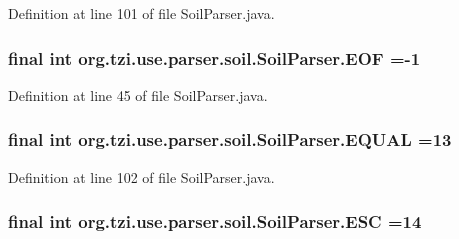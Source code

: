Definition at line 101 of file Soil\-Parser.\-java.

\hypertarget{classorg_1_1tzi_1_1use_1_1parser_1_1soil_1_1_soil_parser_aa3e8fb753d23bb565005ac82b188b1dd}{
\subsubsection[{E\-O\-F}]{\setlength{\rightskip}{0pt plus 5cm}final int org.\-tzi.\-use.\-parser.\-soil.\-Soil\-Parser.\-E\-O\-F =-\/1\hspace{0.3cm}{\ttfamily [static]}}}\label{classorg_1_1tzi_1_1use_1_1parser_1_1soil_1_1_soil_parser_aa3e8fb753d23bb565005ac82b188b1dd}


Definition at line 45 of file Soil\-Parser.\-java.

\hypertarget{classorg_1_1tzi_1_1use_1_1parser_1_1soil_1_1_soil_parser_ac070811cf3cd08099f17e7a3bf125b55}{
\subsubsection[{E\-Q\-U\-A\-L}]{\setlength{\rightskip}{0pt plus 5cm}final int org.\-tzi.\-use.\-parser.\-soil.\-Soil\-Parser.\-E\-Q\-U\-A\-L =13\hspace{0.3cm}{\ttfamily [static]}}}\label{classorg_1_1tzi_1_1use_1_1parser_1_1soil_1_1_soil_parser_ac070811cf3cd08099f17e7a3bf125b55}


Definition at line 102 of file Soil\-Parser.\-java.

\hypertarget{classorg_1_1tzi_1_1use_1_1parser_1_1soil_1_1_soil_parser_a71c699ea05651735750e58d9ce148dcb}{
\subsubsection[{E\-S\-C}]{\setlength{\rightskip}{0pt plus 5cm}final int org.\-tzi.\-use.\-parser.\-soil.\-Soil\-Parser.\-E\-S\-C =14\hspace{0.3cm}{\ttfamily [static]}}}\label{classorg_1_1tzi_1_1use_1_1parser_1_1soil_1_1_soil_parser_a71c699ea05651735750e58d9ce148dcb}


